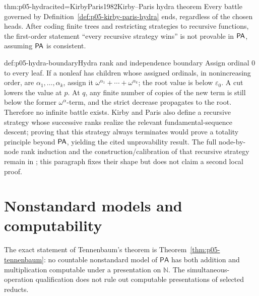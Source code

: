 \begin{hbtheorem}{thm:p05-hydra}{cited=KirbyParis1982}{Kirby--Paris hydra theorem}
Every battle governed by Definition~\ref{def:p05-kirby-paris-hydra} ends,
regardless of the chosen heads.  After coding finite trees and restricting
strategies to recursive functions, the first-order statement “every recursive
strategy wins” is not provable in \(\mathsf{PA}\), assuming \(\mathsf{PA}\) is consistent.
\end{hbtheorem}

\begin{proofboundary}{def:p05-hydra-boundary}{Hydra rank and independence boundary}
Assign ordinal \(0\) to every leaf.  If a nonleaf has children whose assigned
ordinals, in nonincreasing order, are
\(\alpha_1,\ldots,\alpha_k\), assign it
\(\omega^{\alpha_1}+\cdots+\omega^{\alpha_k}\); the root value is below
\(\varepsilon_0\).  A cut lowers the value at \(p\).  At \(q\), any finite
number of copies of the new term is still below the former
\(\omega^{\alpha}\)-term, and the strict decrease propagates to the root.
Therefore no infinite battle exists.  Kirby and Paris also define a recursive
strategy whose successive ranks realize the relevant fundamental-sequence
descent; proving that this strategy always terminates would prove a totality
principle beyond \(\mathsf{PA}\), yielding the cited unprovability result.  The full
node-by-node rank induction and the construction/calibration of that recursive
strategy remain in \cite{KirbyParis1982}; this paragraph fixes their shape but
does not claim a second local proof.
\end{proofboundary}

\section{Nonstandard models and computability}

The exact statement of Tennenbaum's theorem is
Theorem~\ref{thm:p05-tennenbaum}: no countable nonstandard model of
\(\mathsf{PA}\) has both addition and multiplication computable under a
presentation on \(\mathbb N\). The simultaneous-operation qualification does
not rule out computable presentations of selected reducts.


